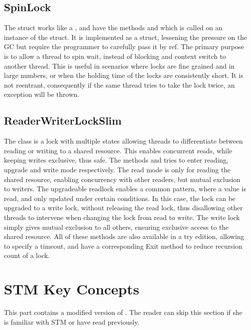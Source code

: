\subsection{SpinLock}
The  struct works like a , and have the methods   and  which is called on an instance of the struct. It is implemented as a struct, lessening the pressure on the \ac{GC} but require the programmer to carefully pass it by ref. The primary purpose is to allow a thread to spin wait, instead of blocking and context switch to another thread. This is useful in scenarios where locks are fine grained and in large numbers, or when the holding  time of the locks are consistently short. It is not reentrant, consequently if the same thread tries to take the lock twice, an exception will be thrown. 

\subsection{ReaderWriterLockSlim}
The class  is a lock with multiple states allowing threads to differentiate between reading or writing to a shared resource. This enables concurrent reads, while keeping writes exclusive, thus safe. The methods   and  tries to enter reading, upgrade and write mode respectively. The read mode is only for reading the shared resource, enabling concurrency with other readers, but mutual exclusion to writers. The upgradeable readlock enables a common pattern, where a value is read, and only updated under certain conditions. In this case, the lock can be upgraded to a write lock, without releasing the read lock, thus disallowing other threads to intervene when changing the lock from read to write. The write lock simply gives mutual exclusion to all others, ensuring exclusive access to the shared resource. All of these methods are also available in a try edition, allowing to specify a timeout, and have a corresponding Exit method to reduce recursion count of a lock.


\section{STM Key Concepts}
This part contains a modified version of \cite[p. 43-48]{dpt907e14trending}. The reader can skip this section if she is familiar with \ac{STM} or have read \cite[chap. 5]{dpt907e14trending} previously.
\label{chap:stm_key_concepts}

